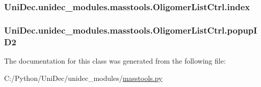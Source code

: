 \subsubsection[{index}]{\setlength{\rightskip}{0pt plus 5cm}Uni\+Dec.\+unidec\+\_\+modules.\+masstools.\+Oligomer\+List\+Ctrl.\+index}\label{class_uni_dec_1_1unidec__modules_1_1masstools_1_1_oligomer_list_ctrl_a72f4b0c84118680e37e76fabaca9c356}
\hypertarget{class_uni_dec_1_1unidec__modules_1_1masstools_1_1_oligomer_list_ctrl_acf7edd84fb70c915724a36e0a37e4b99}{}
\subsubsection[{popup\+I\+D2}]{\setlength{\rightskip}{0pt plus 5cm}Uni\+Dec.\+unidec\+\_\+modules.\+masstools.\+Oligomer\+List\+Ctrl.\+popup\+I\+D2}\label{class_uni_dec_1_1unidec__modules_1_1masstools_1_1_oligomer_list_ctrl_acf7edd84fb70c915724a36e0a37e4b99}


The documentation for this class was generated from the following file\+:\begin{DoxyCompactItemize}
\item 
C\+:/\+Python/\+Uni\+Dec/unidec\+\_\+modules/\hyperlink{masstools_8py}{masstools.\+py}\end{DoxyCompactItemize}
